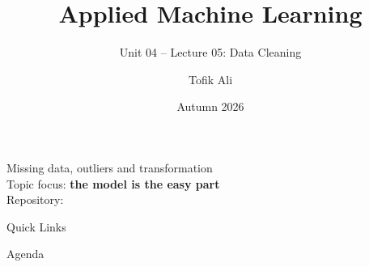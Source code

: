 \documentclass[aspectratio=169]{beamer}
\title[Applied Machine Learning]{Applied Machine Learning}
\subtitle{Unit 04 -- Lecture 05: Data Cleaning}
\author{Tofik Ali}
\institute{School of Computer Science, UPES Dehradun}
\date{Autumn 2026}
\begin{document}
\UPESCoverFrame
\setcounter{framenumber}{0}

\begin{frame}
  \titlepage
  \vspace{0.3em}
  \begin{center}
    \footnotesize Missing data, outliers and transformation\\[0.25em]
    \footnotesize Topic focus: \textbf{the model is the easy part}\\[0.25em]
    \footnotesize Repository: \texttt{\AMLRepoURL}
  \end{center}
  \slidesources{\AMLUnitIVSources}
\end{frame}

\begin{frame}{Quick Links}
  \centering
  \hyperlink{sec:why}{}\hspace{0.4em}
  \hyperlink{sec:missing}{}\hspace{0.4em}
  \hyperlink{sec:outliers}{}\hspace{0.4em}
  \hyperlink{sec:transform}{}\hspace{0.4em}
  \hyperlink{sec:leak}{}\hspace{0.4em}
  \hyperlink{sec:summary}{}
\end{frame}

\begin{frame}{Agenda}
  \tableofcontents
\end{frame}
\end{document}
